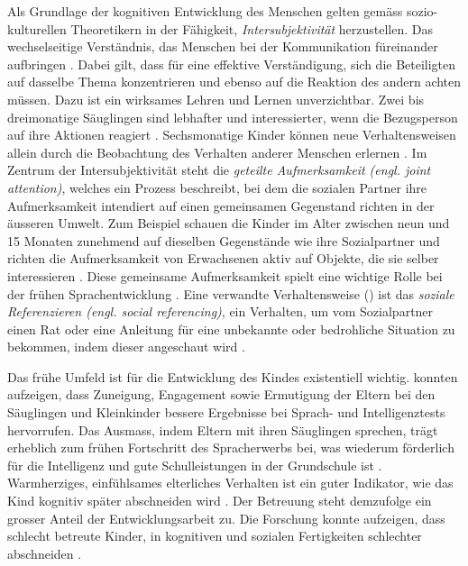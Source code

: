 Als Grundlage der kognitiven Entwicklung des Menschen gelten gemäss sozio-kulturellen Theoretikern in der Fähigkeit, \textit{Intersubjektivität} herzustellen. Das wechselseitige Verständnis, das Menschen bei der Kommunikation füreinander aufbringen \cite{Gauvain2001, Rogoff1990}. Dabei gilt, dass für eine effektive Verständigung, sich die Beteiligten auf dasselbe Thema konzentrieren und ebenso auf die Reaktion des andern achten müssen. Dazu ist ein wirksames Lehren und Lernen unverzichtbar. Zwei bis dreimonatige Säuglingen sind lebhafter und interessierter, wenn die Bezugsperson auf ihre Aktionen reagiert \cite{Murray1985}. Sechsmonatige Kinder können neue Verhaltensweisen allein durch die Beobachtung des Verhalten anderer Menschen erlernen \cite{Collie1999}. Im Zentrum der Intersubjektivität steht die \textit{geteilte Aufmerksamkeit (engl. joint attention)}, welches ein Prozess beschreibt, bei dem die sozialen Partner ihre Aufmerksamkeit intendiert auf einen gemeinsamen Gegenstand richten in der äusseren Umwelt. Zum Beispiel schauen die Kinder im Alter zwischen neun und 15 Monaten zunehmend auf dieselben Gegenstände wie ihre Sozialpartner und richten die Aufmerksamkeit von Erwachsenen aktiv auf Objekte, die sie selber interessieren \cite{Adamson1991, Gauvain2001}. Diese gemeinsame Aufmerksamkeit spielt eine wichtige Rolle bei der frühen Sprachentwicklung \cite[S.~232]{Berk2011}. Eine verwandte Verhaltensweise () ist das \textit{soziale Referenzieren (engl. social referencing)}, ein Verhalten, um vom Sozialpartner einen Rat oder eine Anleitung für eine unbekannte oder bedrohliche Situation zu bekommen, indem dieser angeschaut wird \cite{Campos1981}. 

Das frühe Umfeld ist für die Entwicklung des Kindes existentiell wichtig.  konnten aufzeigen, dass Zuneigung, Engagement sowie Ermutigung der Eltern bei den Säuglingen und Kleinkinder bessere Ergebnisse bei Sprach- und Intelligenztests hervorrufen. Das Ausmass, indem Eltern mit ihren Säuglingen sprechen, trägt erheblich zum frühen Fortschritt des Spracherwerbs bei, was wiederum förderlich für die Intelligenz und gute Schulleistungen in der Grundschule ist \cite{Hart1995}. Warmherziges, einfühlsames elterliches Verhalten ist ein guter Indikator, wie das Kind kognitiv später abschneiden wird \cite[S.~225]{Berk2011}. Der Betreuung steht demzufolge ein grosser Anteil der Entwicklungsarbeit zu. Die Forschung konnte aufzeigen, dass schlecht betreute Kinder, in kognitiven und sozialen Fertigkeiten schlechter abschneiden \cite{NICHD2006}.

